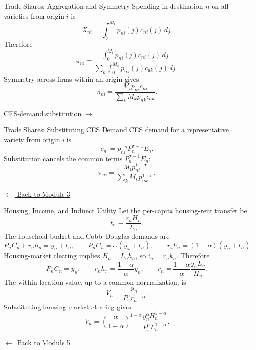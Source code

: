 \documentclass[aspectratio=169,11pt]{beamer}
\newcommand{\backlink}[2]{%
  \hyperlink{#1}{\textcolor{blue1}{\footnotesize
  \(\longleftarrow\) #2}}}
\begin{document}
\begin{frame}[label=appTrade]{Trade Shares: Aggregation and Symmetry}
  \small
  Spending in destination \(n\) on all varieties from origin \(i\) is
  \[
    X_{ni}
    =
    \int_0^{M_i}p_{ni}(j)c_{ni}(j)\,dj.
  \]
  Therefore
  \[
    \pi_{ni}
    \equiv
    \frac{\displaystyle\int_0^{M_i}p_{ni}(j)c_{ni}(j)\,dj}
         {\displaystyle\sum_k\int_0^{M_k}p_{nk}(j)c_{nk}(j)\,dj}.
  \]
  Symmetry across firms within an origin gives
  \[
    \pi_{ni}
    =
    \frac{M_ip_{ni}c_{ni}}
         {\sum_kM_kp_{nk}c_{nk}}.
  \]

  \vfill
  \hfill\hyperlink{appTradeCES}{\textcolor{blue1}{\footnotesize
  CES-demand substitution \(\longrightarrow\)}}
\end{frame}

\begin{frame}[label=appTradeCES]{Trade Shares: Substituting CES Demand}
  \small
  CES demand for a representative variety from origin \(i\) is
  \[
    c_{ni}=p_{ni}^{-\sigma}P_n^{\sigma-1}E_n.
  \]
  Substitution cancels the common terms \(P_n^{\sigma-1}E_n\):
  \[
    \pi_{ni}
    =
    \frac{M_ip_{ni}^{1-\sigma}}
         {\sum_kM_kp_{nk}^{1-\sigma}}.
  \]

  \smallskip
  \hfill\backlink{mainTradeShares}{Back to Module 3}
\end{frame}

\begin{frame}[t,label=appHousingIncome]{Housing, Income, and Indirect Utility}
  \footnotesize
  Let the per-capita housing-rent transfer be
  \[
    t_n\equiv\frac{r_nH_n}{L_n}.
  \]
  The household budget and Cobb--Douglas demands are
  \[
    P_nC_n+r_nh_n=y_n+t_n,
    \qquad
    P_nC_n=\alpha(y_n+t_n),
    \qquad
    r_nh_n=(1-\alpha)(y_n+t_n).
  \]
  Housing-market clearing implies \(H_n=L_nh_n\), so \(t_n=r_nh_n\).
  Therefore
  \[
    P_nC_n=y_n,
    \qquad
    r_nh_n=\frac{1-\alpha}{\alpha}y_n,
    \qquad
    r_n=\frac{1-\alpha}{\alpha}\frac{y_nL_n}{H_n}.
  \]
  The within-location value, up to a common normalization, is
  \[
    V_n
    =\frac{y_n}{P_n^\alpha r_n^{1-\alpha}}.
  \]
  Substituting housing-market clearing gives
  \[
    V_n
    =
    \left(\frac{\alpha}{1-\alpha}\right)^{1-\alpha}
    \frac{y_n^\alpha H_n^{1-\alpha}}
    {P_n^\alpha L_n^{1-\alpha}}.
  \]

  \vfill
  \hfill\backlink{mainMigration}{Back to Module 5}
\end{frame}
\end{document}
